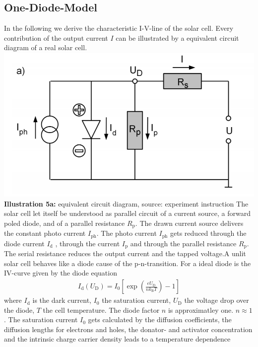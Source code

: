 \documentclass[a4paper, 12pt]{scrartcl}
\begin{document}
\subsection{One-Diode-Model}
In the following we derive the characteristic I-V-line of the solar cell. Every contribution of the output current $I$ can be illustrated by a equivalent circuit diagram of a real solar cell. 
\newline 
\hspace*{+4cm}
\includegraphics[scale=0.5]{szpic5a}
\newline 
\textbf{Illustration 5a:} equivalent circuit diagram, source: experiment instruction 
\newline 
The solar cell let itself be understood as parallel circuit of a current source, a forward poled diode, and of a parallel resistance $R_\textrm{p}$. The drawn current source delivers the constant photo current $I_\textrm{ph}$. The photo current $I_\textrm{ph}$ gets reduced through the diode current $I_\textrm{d}$ , through the current $I_\textrm{p}$ and through the parallel resistance $R_\textrm{p}$. The serial resistance reduces the output current and the tapped voltage.A unlit solar cell behaves like a diode cause of the p-n-transition. For a ideal diode is the IV-curve given by the diode equation
\begin{align}
I_\textrm{d}(U_\textrm{D}) = I_0 \left[ \exp \left( \frac{e U_\textrm{D}}{nk_\textrm{B}T}\right) -1 \right]
\end{align}
where $I_\textrm{d}$ is the dark current, $I_0$ the saturation current, $U_\textrm{D}$ the voltage drop over the diode, $T$ the cell temperature. The diode factor $n$ is approximatley one. $n \approx 1$. The saturation current $I_0$ gets calculated by the diffusion coefficients, the diffusion lengths for electrons and holes, the donator- and activator concentration and the intrinsic charge carrier density leads to a temperature dependence 
\end{document}
